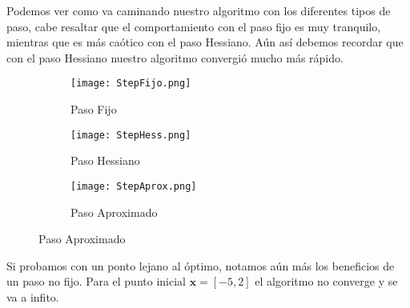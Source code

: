 \documentclass{article}
\begin{document}
\begin{enumerate}
Podemos ver como va caminando nuestro algoritmo con los diferentes tipos de paso, cabe resaltar que el comportamiento con el paso fijo es muy tranquilo, mientras que es más caótico con el paso Hessiano. Aún así debemos recordar que con el paso Hessiano nuestro algoritmo convergió mucho más rápido.

\begin{figure}[ht]
\begin{subfigure}[b]{0.3\linewidth}
    \centering
    \texttt{[image: StepFijo.png]}
    \caption{Paso Fijo}
    \label{fig:r2f1}
\end{subfigure}
\begin{subfigure}[b]{0.3\linewidth}
    \centering
    \texttt{[image: StepHess.png]}
    \caption{Paso Hessiano}
    \label{fig:r2h1}
\end{subfigure}
\begin{subfigure}[b]{0.3\linewidth}
    \centering
    \texttt{[image: StepAprox.png]}
    \caption{Paso Aproximado}
    \label{fig:r2a1}
\end{subfigure}
\end{figure}

Si probamos con un ponto lejano al óptimo, notamos aún más los beneficios de un paso no fijo. Para el punto inicial $\boldsymbol{x} = [-5, 2]$ el algoritmo no converge y se va a infito.



\end{enumerate}
\end{document}
